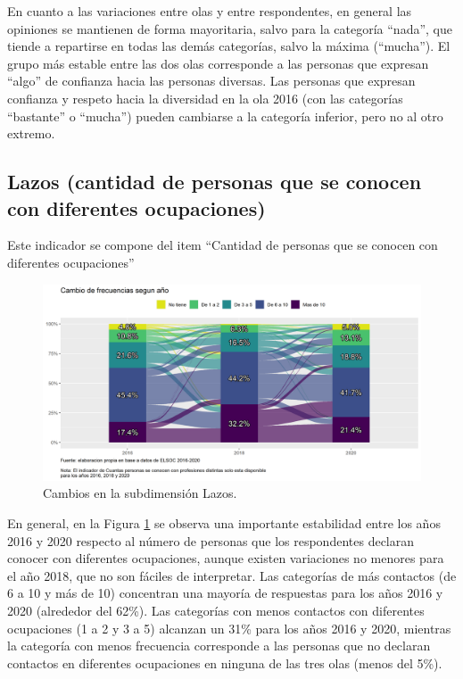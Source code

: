 \documentclass[
  12pt,
]{book}
\begin{document}
En cuanto a las variaciones entre olas y entre respondentes, en general las opiniones se mantienen de forma mayoritaria, salvo para la categoría ``nada'', que tiende a repartirse en todas las demás categorías, salvo la máxima (``mucha''). El grupo más estable entre las dos olas corresponde a las personas que expresan ``algo'' de confianza hacia las personas diversas. Las personas que expresan confianza y respeto hacia la diversidad en la ola 2016 (con las categorías ``bastante'' o ``mucha'') pueden cambiarse a la categoría inferior, pero no al otro extremo.

\hypertarget{lazos-cantidad-de-personas-que-se-conocen-con-diferentes-ocupaciones}{%
\subsection{Lazos (cantidad de personas que se conocen con diferentes ocupaciones)}\label{lazos-cantidad-de-personas-que-se-conocen-con-diferentes-ocupaciones}}

Este indicador se compone del item ``Cantidad de personas que se conocen con diferentes ocupaciones''

\begin{figure}[H]

{\centering \includegraphics[width=1\linewidth,height=1\textheight]{output/graphs/alluvial_lazos} 

}

\caption{Cambios en la subdimensión Lazos.}\label{fig:alluvial-lazos}
\end{figure}

En general, en la Figura \ref{fig:alluvial-lazos} se observa una importante estabilidad entre los años 2016 y 2020 respecto al número de personas que los respondentes declaran conocer con diferentes ocupaciones, aunque existen variaciones no menores para el año 2018, que no son fáciles de interpretar. Las categorías de más contactos (de 6 a 10 y más de 10) concentran una mayoría de respuestas para los años 2016 y 2020 (alrededor del 62\%). Las categorías con menos contactos con diferentes ocupaciones (1 a 2 y 3 a 5) alcanzan un 31\% para los años 2016 y 2020, mientras la categoría con menos frecuencia corresponde a las personas que no declaran contactos en diferentes ocupaciones en ninguna de las tres olas (menos del 5\%).
\end{document}
